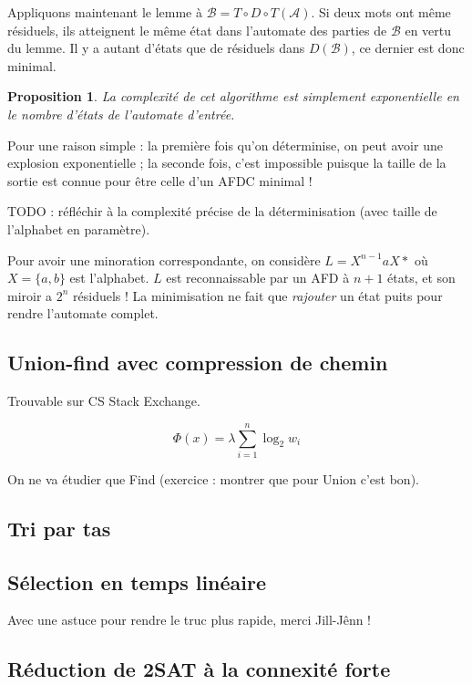 \documentclass[a4paper, 11pt]{article}
\newtheorem*{proposition}{Proposition}
\begin{document}
Appliquons maintenant le lemme à $\mathcal{B} = T \circ D \circ T(\mathcal{A})$.
Si deux mots ont même résiduels, ils atteignent le même état dans l'automate des
parties de $\mathcal{B}$ en vertu du lemme. Il y a autant d'états que de
résiduels dans $D(\mathcal{B})$, ce dernier est donc minimal.

\begin{proposition}
  La complexité de cet algorithme est simplement exponentielle en le nombre
  d'états de l'automate d'entrée.
\end{proposition}

Pour une raison simple : la première fois qu'on déterminise, on peut avoir une
explosion exponentielle ; la seconde fois, c'est impossible puisque la taille de
la sortie est connue pour être celle d'un AFDC minimal !

TODO : réfléchir à la complexité précise de la déterminisation (avec taille de
l'alphabet en paramètre).

Pour avoir une minoration correspondante, on considère $L = X^{n-1}aX*$ où $X =
\{a,b\}$ est l'alphabet. $L$ est reconnaissable par un AFD à $n+1$ états, et son
miroir a $2^n$ résiduels ! La minimisation ne fait que \emph{rajouter} un état
puits pour rendre l'automate complet.

\subsection{Union-find avec compression de chemin}

Trouvable sur CS Stack Exchange.

\[ \Phi(x) = \lambda \sum_{i=1}^n \log_2 w_i \]

On ne va étudier que Find (exercice : montrer que pour Union c'est bon).

\subsection{Tri par tas}

\subsection{Sélection en temps linéaire}

Avec une astuce pour rendre le truc plus rapide, merci Jill-Jênn !

\subsection{Réduction de 2SAT à la connexité forte}
\end{document}
